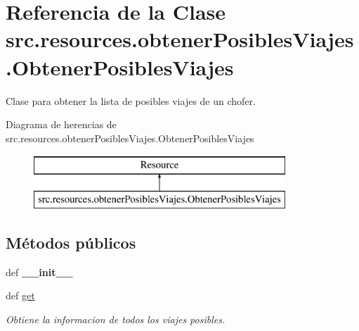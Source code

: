 \hypertarget{classsrc_1_1resources_1_1obtener_posibles_viajes_1_1_obtener_posibles_viajes}{\section{Referencia de la Clase src.\-resources.\-obtener\-Posibles\-Viajes.\-Obtener\-Posibles\-Viajes}
\label{classsrc_1_1resources_1_1obtener_posibles_viajes_1_1_obtener_posibles_viajes}
}


Clase para obtener la lista de posibles viajes de un chofer.  


Diagrama de herencias de src.\-resources.\-obtener\-Posibles\-Viajes.\-Obtener\-Posibles\-Viajes\begin{figure}[H]
\begin{center}
\leavevmode
\includegraphics[height=2.000000cm]{classsrc_1_1resources_1_1obtener_posibles_viajes_1_1_obtener_posibles_viajes}
\end{center}
\end{figure}
\subsection*{Métodos públicos}
\begin{DoxyCompactItemize}
\item 
\hypertarget{classsrc_1_1resources_1_1obtener_posibles_viajes_1_1_obtener_posibles_viajes_ad93d3f991ef591efe6c5cef717b75967}{def {\bfseries \-\_\-\-\_\-init\-\_\-\-\_\-}}\label{classsrc_1_1resources_1_1obtener_posibles_viajes_1_1_obtener_posibles_viajes_ad93d3f991ef591efe6c5cef717b75967}

\item 
def \hyperlink{classsrc_1_1resources_1_1obtener_posibles_viajes_1_1_obtener_posibles_viajes_a987e5ab35e776e08efdd48277fc0f139}{get}
\begin{DoxyCompactList}\small\item\em Obtiene la informacion de todos los viajes posibles. \end{DoxyCompactList}\end{DoxyCompactItemize}
